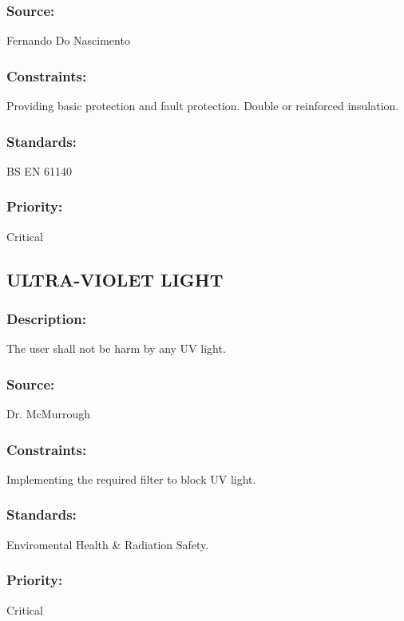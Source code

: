 \subsubsection{Source:} 
	{Fernando Do Nascimento}
\subsubsection{Constraints:} 
	{Providing basic protection and fault protection. Double or reinforced insulation.}
\subsubsection{Standards:} 
	{BS EN 61140}
\subsubsection{Priority:} 
	{Critical}
\newline
\newline
	
\subsection{\text  ULTRA-VIOLET LIGHT}
\subsubsection{Description:} 
	{The user shall not be harm by any UV light.}
\subsubsection{Source:} 
	{Dr. McMurrough}
\subsubsection{Constraints:} 
	{Implementing the required filter to block UV light.}
\subsubsection{Standards:} 
	{Enviromental Health \& Radiation Safety.}
\subsubsection{Priority:} 
	{Critical}
	
